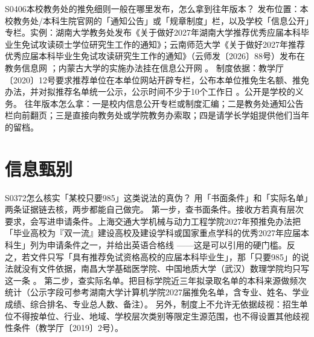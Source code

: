\begin{qa}{S0406}{本校教务处的推免细则一般在哪里发布，怎么拿到往年版本？}
发布位置：本校教务处/本科生院官网的「通知公告」或「规章制度」栏，以及学校「信息公开」专栏。实例：湖南大学教务处发布《关于做好2027年湖南大学推荐优秀应届本科毕业生免试攻读硕士学位研究生工作的通知》；云南师范大学《关于做好2027年推荐优秀应届本科毕业生免试攻读研究生工作的通知》（云师发〔2026〕88号）发布在教务信息网 ；内蒙古大学的实施办法挂在信息公开网 。
制度依据：教学厅〔2020〕12号要求推荐单位在本单位网站开辟专栏，公布本单位推免生名额、推免办法，并对拟推荐名单统一公示，公示时间不少于10个工作日 。公开是学校的义务。
往年版本怎么拿：一是校内信息公开专栏或制度汇编；二是教务处通知公告栏向前翻页；三是直接向教务处或学院教务办索取；四是请学长学姐提供他们当年的留档。
\end{qa}

\section{信息甄别}
\begin{qa}{S0372}{怎么核实「某校只要985」这类说法的真伪？}
用「书面条件」和「实际名单」两条证据链去核，两步都能自己做完。
第一步，查书面条件。接收方若真有层次要求，会写进申请条件。上海交通大学机械与动力工程学院2027年预推免办法把「毕业高校为『双一流』建设高校及建设学科或国家重点学科的优秀2027年应届本科生」列为申请条件之一，并给出英语合格线 ——这是可以引用的硬门槛。反之，若文件只写「具有推荐免试资格高校的应届本科毕业生」，那「只要985」的说法就没有文件依据，南昌大学基础医学院、中国地质大学（武汉）数理学院均只写这一条 。
第二步，查实际名单。把目标学院近三年拟录取名单的本科来源做频次统计（公示字段可参考湖南大学计算机学院2027届推免名单，含专业、姓名、学业成绩、综合排名、专业总人数、备注）。
另外，制度上不允许无依据歧视：招生单位不得按单位、行业、地域、学校层次类别等限定生源范围，也不得设置其他歧视性条件（教学厅〔2019〕2号）。
\end{qa}

